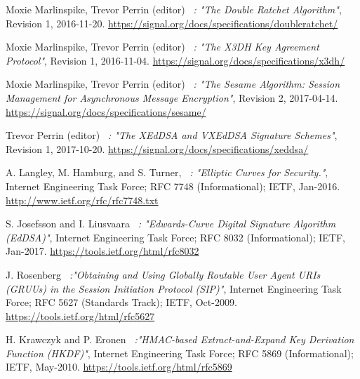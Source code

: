 \documentclass[a4paper,11pt]{article}
\begin{document}
\begin{thebibliography}{99}

  Moxie Marlinspike, Trevor Perrin (editor)
  \textit{\ : "The Double Ratchet Algorithm"},
  Revision 1,
  2016-11-20.
  \href{https://signal.org/docs/specifications/doubleratchet/}{https://signal.org/docs/specifications/doubleratchet/}

  Moxie Marlinspike, Trevor Perrin (editor)
  \textit{\ : "The X3DH Key Agreement Protocol"},
  Revision 1,
  2016-11-04.
  \href{https://signal.org/docs/specifications/x3dh/}{https://signal.org/docs/specifications/x3dh/} 

  Moxie Marlinspike, Trevor Perrin (editor)
  \textit{\ : "The Sesame Algorithm: Session Management for Asynchronous Message Encryption"},
  Revision 2,
  2017-04-14.
  \href{https://signal.org/docs/specifications/sesame/}{https://signal.org/docs/specifications/sesame/}

  Trevor Perrin (editor)
  \textit{\ : "The XEdDSA and VXEdDSA Signature Schemes"},
  Revision 1,
  2017-10-20.
  \href{https://signal.org/docs/specifications/xeddsa/}{https://signal.org/docs/specifications/xeddsa/}

  A. Langley, M. Hamburg, and S. Turner,
  \textit{\ : "Elliptic Curves for Security."},
  Internet Engineering Task Force; RFC 7748 (Informational); IETF, Jan-2016.
  \href{http://www.ietf.org/rfc/rfc7748.txt}{http://www.ietf.org/rfc/rfc7748.txt}
  
  S. Josefsson and I. Liusvaara
  \textit{\ : "Edwards-Curve Digital Signature Algorithm (EdDSA)"},
  Internet Engineering Task Force; RFC 8032 (Informational); IETF, Jan-2017.
  \href{https://tools.ietf.org/html/rfc8032}{https://tools.ietf.org/html/rfc8032}

  J. Rosenberg
  \textit{\ :"Obtaining and Using Globally Routable User Agent URIs (GRUUs) in the Session Initiation Protocol (SIP)"},
  Internet Engineering Task Force; RFC 5627 (Standards Track); IETF, Oct-2009.
  \href{https://tools.ietf.org/html/rfc5627}{https://tools.ietf.org/html/rfc5627}
  
  H. Krawczyk and P. Eronen
  \textit{\ :"HMAC-based Extract-and-Expand Key Derivation Function (HKDF)"},
  Internet Engineering Task Force; RFC 5869 (Informational); IETF, May-2010.
  \href{https://tools.ietf.org/html/rfc5869}{https://tools.ietf.org/html/rfc5869}
  

\end{thebibliography}
\end{document}
